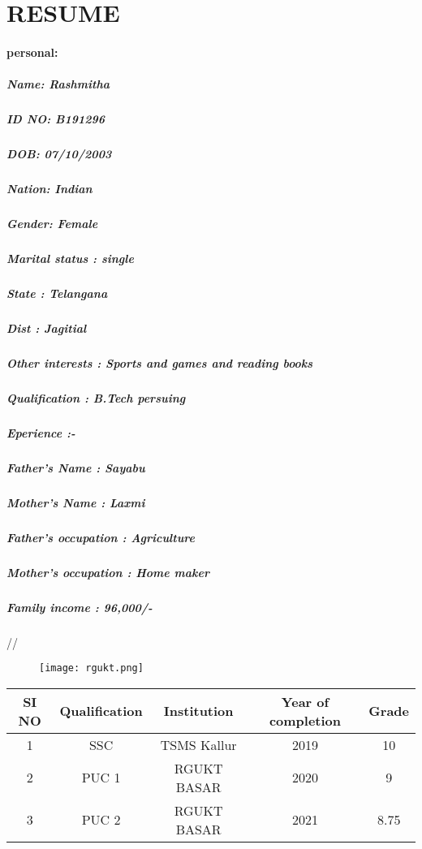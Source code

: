 \documentclass[a4paper,10pt]{article}
\begin{document}
 
\section{RESUME}

 \paragraph{personal:} 

\subparagraph{Name: Rashmitha}
\subparagraph{ID NO: B191296}
\subparagraph{DOB: 07/10/2003}
\subparagraph{Nation: Indian}
\subparagraph{Gender: Female}
\subparagraph{Marital status : single}
\subparagraph{State : Telangana}
\subparagraph{Dist : Jagitial}
\subparagraph{Other interests : Sports and games and reading books}
\subparagraph{Qualification : B.Tech persuing}
\subparagraph{Eperience :-}
\subparagraph{Father's Name : Sayabu}
\subparagraph{Mother's Name : Laxmi}
\subparagraph{Father's occupation : Agriculture}
\subparagraph{Mother's occupation : Home maker}
\subparagraph{Family income : 96,000/-}//

\begin{figure}[h]
\texttt{[image: rgukt.png]}
 
\end{figure}


\begin{tabular}{|c|c|c|c|c|}
\hline
 
SI NO & Qualification & Institution & Year of completion & Grade\\

\hline
1 & SSC & TSMS Kallur & 2019 & 10\\
\hline
2 & PUC 1 & RGUKT BASAR & 2020 & 9\\
\hline
3 & PUC 2 & RGUKT BASAR & 2021 & 8.75\\
\hline
\end{tabular}
\end{document}
